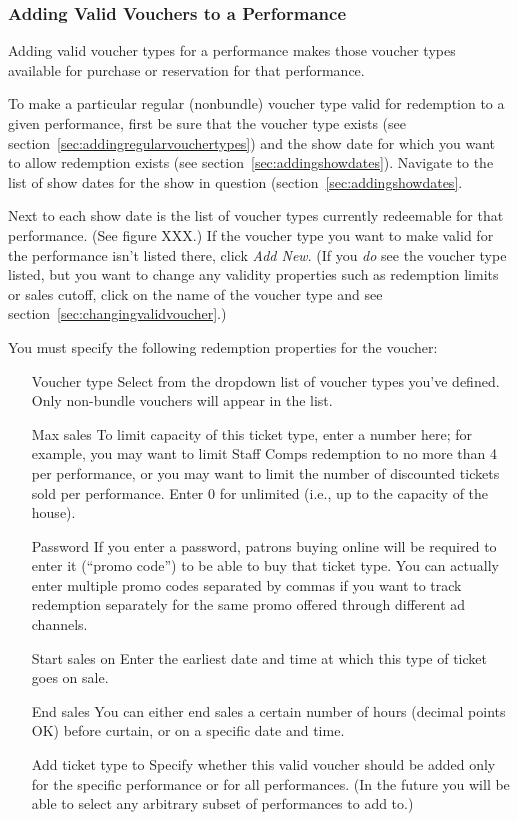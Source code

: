 \subsubsection{Adding Valid Vouchers to a Performance}
\label{sec:addingvalidvouchers}

Adding valid voucher types for a performance makes those voucher types
available for purchase or reservation for that performance.

To make a particular regular (nonbundle) voucher type valid for
redemption to a given performance, first be sure that the voucher type
exists (see section~\ref{sec:addingregularvouchertypes}) and the show
date for which you want to allow redemption exists (see
section~\ref{sec:addingshowdates}).  Navigate to the list of show dates
for the show in question (section~\ref{sec:addingshowdates}.

Next to each show date is the list of voucher types currently redeemable
for that performance.  (See figure XXX.)  If the voucher type you want
to make valid for the performance isn't listed there, click \emph{Add
  New}.  (If you \emph{do} see the voucher type listed, but you want to
change any validity properties such as redemption limits or sales
cutoff, click on the name of the voucher type and see
section~\ref{sec:changingvalidvoucher}.) 

You must specify the following redemption properties for the voucher:

\begin{itemize}
\item[Voucher type] Select from the dropdown list of voucher types
  you've defined.  Only non-bundle vouchers will appear in the list.
\item[Max sales] To limit capacity of this ticket type, enter a number
  here; for example, you may want to limit Staff Comps redemption to no
  more than 4 per performance, or you may want to limit the number of
  discounted tickets sold per performance. Enter 0 for unlimited (i.e.,
  up to the capacity of the house).
\item[Password] If you enter a password, patrons buying online will be
  required to enter it (``promo code'') to be able to buy that ticket
  type.  You can actually enter multiple promo codes separated by commas
  if you want to track redemption separately for the same promo offered
  through different ad channels.
\item[Start sales on] Enter the earliest date and time at which this
  type of ticket goes on sale.
\item[End sales] You can either end sales a certain number of hours
  (decimal points OK) before curtain, or on a specific date and time.
\item[Add ticket type to] Specify whether this valid voucher should be
  added only for the specific performance or for all performances. (In
  the future you will be able to select any arbitrary subset of
  performances to add to.)
\end{itemize}

